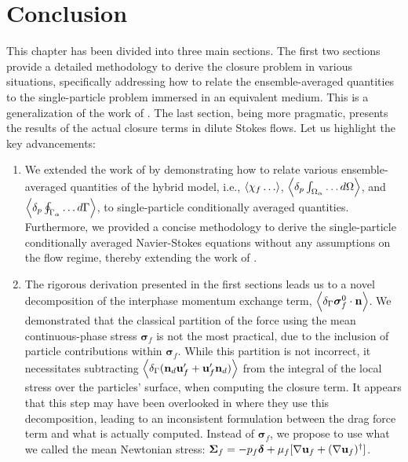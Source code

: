 \section{Conclusion}
This chapter has been divided into three main sections. 
The first two sections provide a detailed methodology to derive the closure problem in various situations, specifically addressing how to relate the ensemble-averaged quantities to the single-particle problem immersed in an equivalent medium. 
This is a generalization of the work of \citet{hinch1977averaged}. 
The last section, being more pragmatic, presents the results of the actual closure terms in dilute Stokes flows. 
Let us highlight the key advancements:
\begin{enumerate}
    \item We extended the work of \citet{lhuillier1992volume,zhang1994ensemble} by demonstrating how to relate various ensemble-averaged quantities of the hybrid model, i.e., $\left<\chi_f\ldots\right>$, $\left<\delta_p \int_{\Omega_{\alpha}} \ldots d\Omega\right>$, and $\left<\delta_p \oint_{\Gamma_{\alpha}} \ldots d\Gamma\right>$, to single-particle conditionally averaged quantities. 
    Furthermore, we provided a concise methodology to derive the single-particle conditionally averaged Navier-Stokes equations without any assumptions on the flow regime, thereby extending the work of \citet{hinch1977averaged}. 
    \item The rigorous derivation presented in the first sections leads us to a novel decomposition of the interphase momentum exchange term, $\left<\delta_\Gamma \bm\sigma_f^0 \cdot \textbf{n}\right>$. 
    We demonstrated that the classical partition of the force using the mean continuous-phase stress $\bm\sigma_f$ is not the most practical, due to the inclusion of particle contributions within $\bm\sigma_f$.
    While this partition is not incorrect, it necessitates subtracting $\left<\delta_\Gamma (\textbf{n}_d \textbf{u}_f' + \textbf{u}_f' \textbf{n}_d)\right>$ from the integral of the local stress over the particles' surface, when computing the closure term. 
    It appears that this step may have been overlooked in \citet{wang2021numerical,wang2024effect} where they use this decomposition, leading to an inconsistent formulation between the drag force term and what is actually computed.
    Instead of $\bm\sigma_f$, we propose to use what we called the mean Newtonian stress: $\bm\Sigma_f = -p_f \bm\delta + \mu_f [\mathbf{\nabla} \textbf{u}_f + (\mathbf{\nabla} \textbf{u}_f)^\dagger]$. 

\end{enumerate}
